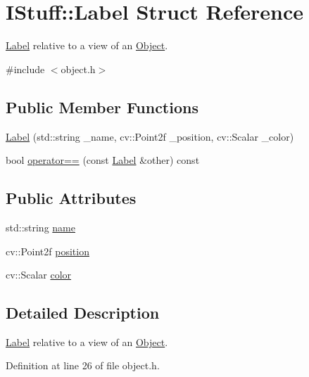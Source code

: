 \hypertarget{struct_i_stuff_1_1_label}{\section{I\-Stuff\-:\-:Label Struct Reference}
\label{struct_i_stuff_1_1_label}
}


\hyperlink{struct_i_stuff_1_1_label}{Label} relative to a view of an \hyperlink{class_i_stuff_1_1_object}{Object}.  




{\ttfamily \#include $<$object.\-h$>$}

\subsection*{Public Member Functions}
\begin{DoxyCompactItemize}
\item 
\hyperlink{struct_i_stuff_1_1_label_aac1f21d615fb8b65f18c7ad76b63e6cf}{Label} (std\-::string \-\_\-name, cv\-::\-Point2f \-\_\-position, cv\-::\-Scalar \-\_\-color)
\item 
bool \hyperlink{struct_i_stuff_1_1_label_af37f54284d7c8f2232b1273bf6be1e96}{operator==} (const \hyperlink{struct_i_stuff_1_1_label}{Label} \&other) const 
\end{DoxyCompactItemize}
\subsection*{Public Attributes}
\begin{DoxyCompactItemize}
\item 
std\-::string \hyperlink{struct_i_stuff_1_1_label_a11026b588c7a66f59bf233529c9aa6ed}{name}
\item 
cv\-::\-Point2f \hyperlink{struct_i_stuff_1_1_label_a06b344b0151f8c836e89d885a2e96975}{position}
\item 
cv\-::\-Scalar \hyperlink{struct_i_stuff_1_1_label_aaa492eddf40936c251bcd5b920e9d696}{color}
\end{DoxyCompactItemize}


\subsection{Detailed Description}
\hyperlink{struct_i_stuff_1_1_label}{Label} relative to a view of an \hyperlink{class_i_stuff_1_1_object}{Object}. 

Definition at line 26 of file object.\-h.



